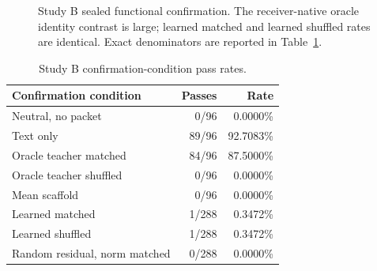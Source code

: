 \documentclass[11pt]{article}
\begin{document}
\begin{figure}[htbp]
\centering
{}
\caption{Study B sealed functional confirmation. The receiver-native oracle identity contrast is large; learned matched and learned shuffled rates are identical. Exact denominators are reported in Table~\ref{tab:study-b-rates}.}
\label{fig:study-b}
\end{figure}

\begin{table}[htbp]
\centering
\caption{Study B confirmation-condition pass rates.}
\label{tab:study-b-rates}
\small
\begin{tabularx}{\textwidth}{>{\raggedright\arraybackslash}X r r}
\toprule
Confirmation condition & Passes & Rate \\
\midrule
Neutral, no packet & 0/96 & 0.0000\% \\
Text only & 89/96 & 92.7083\% \\
Oracle teacher matched & 84/96 & 87.5000\% \\
Oracle teacher shuffled & 0/96 & 0.0000\% \\
Mean scaffold & 0/96 & 0.0000\% \\
Learned matched & 1/288 & 0.3472\% \\
Learned shuffled & 1/288 & 0.3472\% \\
Random residual, norm matched & 0/288 & 0.0000\% \\
\bottomrule
\end{tabularx}
\end{table}
\end{document}
